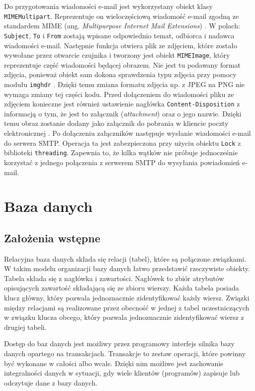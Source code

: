 \documentclass[a4paper,11pt,twoside]{article}
\begin{document}
Do przygotowania wiadomości e-mail jest wykorzystany obiekt klasy \texttt{MIMEMultipart}. Reprezentuje on wieloczęściową wiadomość e-mail zgodną ze standardem MIME (ang. \textit{Multipurpose Internet Mail Extensions}) \cite{mime1}\cite{mime2}.  W polach: \texttt{Subject}, \texttt{To} i \texttt{From} zostają wpisane odpowiednio temat, odbiorca i nadawca wiadomości e-mail. Następnie funkcja otwiera plik ze zdjęciem, które zostało wywołane przez otwarcie czujnika i tworzony jest obiekt \texttt{MIMEImage}, który reprezentuje część wiadomości będącej obrazem. Nie jest tu podawany format zdjęcia, ponieważ obiekt sam dokona sprawdzenia typu zdjęcia przy pomocy modułu \texttt{imghdr} \cite{python-mime}. Dzięki temu zmiana formatu zdjęcia np. z JPEG na PNG nie wymaga zmiany tej części kodu. Przed dołączeniem do wiadomości pliku ze zdjęciem konieczne jest również ustawienie nagłówka \texttt{Content-Disposition} z informacją o tym, że jest to załącznik (\textit{attachment}) oraz o jego nazwie. Dzięki temu obraz zostanie dodany jako załącznik do pobrania w kliencie poczty elektronicznej \cite{content-disposition}. Po dołączeniu załączników następuje wysłanie wiadomości e-mail do serwera SMTP. Operacja ta jest zabezpieczona przy użyciu obiektu \texttt{Lock} z biblioteki \texttt{threading}. Zapewnia to, że kilka wątków nie próbuje jednocześnie korzystać z jednego połączenia z serwerem SMTP do wysyłania powiadomień e-mail.
\newpage

\section{Baza danych}
\subsection{Założenia wstępne}
Relacyjna baza danych składa się relacji (tabel), które są połączone związkami. W takim modelu organizacji bazy danych łatwo przedstawić rzeczywiste obiekty. Tabela składa się z nagłówka i zawartości. Nagłówek to zbiór atrybutów opisujących zawartość składającą się ze zbioru wierszy. Każda tabela posiada klucz główny, który pozwala jednoznacznie zidentyfikować każdy wiersz. Związki między relacjami są realizowane przez obecność w jednej z tabel uczestniczących w związku klucza obcego, który pozwala jednoznacznie zidentyfikować wiersz z drugiej tabeli.

Dostęp do baz danych jest możliwy przez programowy interfejs silnika bazy danych opartego na transakcjach. Transakcje to zestaw operacji, które powinny być wykonane w całości albo wcale. Dzięki nim możliwe jest zachowanie integralności danych w sytuacji, gdy wiele klientów (programów) zapisuje lub odczytuje dane z bazy danych.
\end{document}

